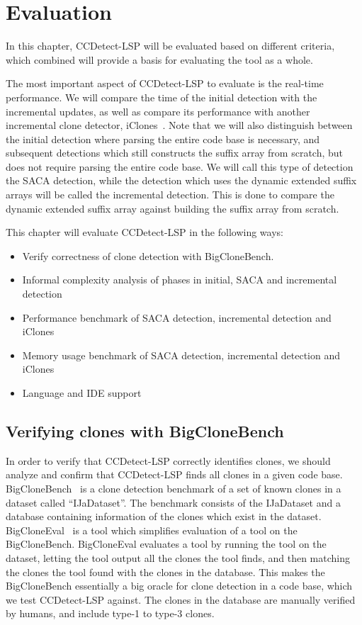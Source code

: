 \chapter{Evaluation}
\label{evaluation}

In this chapter, CCDetect-LSP will be evaluated based on different criteria, which combined
will provide a basis for evaluating the tool as a whole.

The most important aspect of CCDetect-LSP to evaluate is the real-time performance. We
will compare the time of the initial detection with the incremental updates, as well as
compare its performance with another incremental clone detector,
iClones~\Cite{GodeIncrementalCloneDetection}. Note that we will also distinguish between
the initial detection where parsing the entire code base is necessary, and subsequent
detections which still constructs the suffix array from scratch, but does not require
parsing the entire code base. We will call this type of detection the SACA detection,
while the detection which uses the dynamic extended suffix arrays will be called the
incremental detection. This is done to compare the dynamic extended suffix array against
building the suffix array from scratch.

This chapter will evaluate CCDetect-LSP in the following ways:

\begin{itemize}
    \item Verify correctness of clone detection with BigCloneBench.
    \item Informal complexity analysis of phases in initial, SACA and incremental detection
    \item Performance benchmark of SACA detection, incremental detection and iClones
    \item Memory usage benchmark of SACA detection, incremental detection and iClones
    \item Language and IDE support
\end{itemize}



\section{Verifying clones with BigCloneBench}

In order to verify that CCDetect-LSP correctly identifies clones, we should analyze and
confirm that CCDetect-LSP finds all clones in a given code base.
BigCloneBench~\cite{BigCloneBench} is a clone detection benchmark of a set of known clones
in a dataset called ``IJaDataset''. The benchmark consists of the IJaDataset and a
database containing information of the clones which exist in the dataset.
BigCloneEval~\cite{BigCloneEval} is a tool which simplifies evaluation of a tool on the
BigCloneBench. BigCloneEval evaluates a tool by running the tool on the dataset, letting
the tool output all the clones the tool finds, and then matching the clones the tool found
with the clones in the database. This makes the BigCloneBench essentially a big oracle for
clone detection in a code base, which we test CCDetect-LSP against. The clones in the
database are manually verified by humans, and include type-1 to type-3 clones.


